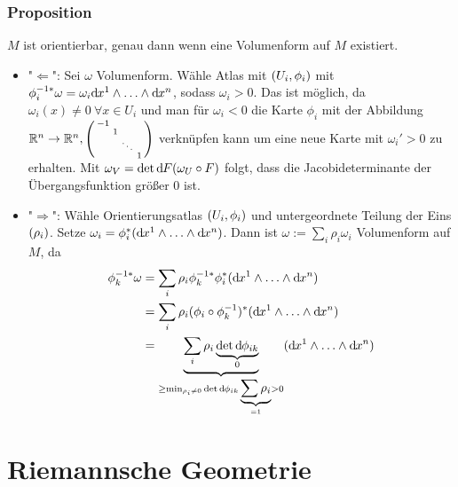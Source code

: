 \subsubsection{Proposition}
\label{ssub:1103}
$M$ ist orientierbar, genau dann wenn eine Volumenform auf $M$ existiert.
\begin{itemize}
\item "$\Leftarrow$": Sei $\omega$ Volumenform. Wähle Atlas mit $\enbrace{U_i,\phi_i}$ mit $\phi_i^{-1*} \omega = \omega_i \mathd x^1 \wedge \ldots \wedge \mathd x^n$, sodass $\omega_i > 0$. Das ist möglich, da $\omega_i(x) \neq 0\ \forall x\in U_i$ und man für $\omega_i < 0$ die Karte $\phi_i$ mit der Abbildung $\mathds{R}^n \to \mathds{R}^n, 
\begin{psmallmatrix}
-1&&&\\
&1&&\\
&&\ddots&\\
&&&1
\end{psmallmatrix}$ verknüpfen kann um eine neue Karte mit $\omega_i' > 0$ zu erhalten. Mit $\omega_V = \det \mathd F(\omega_U \circ F)$ folgt, dass die Jacobideterminante der Übergangsfunktion größer $0$ ist.
\item "$\Rightarrow$": Wähle Orientierungsatlas $\enbrace{U_i,\phi_i}$ und untergeordnete Teilung der Eins $\enbrace{\rho_i}$. Setze $\omega_i = \phi_i^*\enbrace{\mathd x^1 \wedge \ldots \wedge \mathd x^n}$. Dann ist $\omega := \sum_i \rho_i \omega_i$ Volumenform auf $M$, da
\begin{align*}
\phi_k^{-1*} \omega &= \sum_i \rho_i \phi_k^{-1*} \phi_i^* \enbrace{\mathd x^1 \wedge \ldots \wedge \mathd x^n}\\
&= \sum_i \rho_i \enbrace{\phi_i\circ \phi_k^{-1}}^* \enbrace{\mathd x^1 \wedge \ldots \wedge \mathd x^n}\\
&= \underbrace{\sum_i \rho_i \underbrace{\det \mathd \phi_{ik}}_{0}}_{\geq \min_{\rho_i \neq 0} \det \mathd \phi_{ik} \underbrace{\sum \rho_i}_{=1} > 0} \enbrace{\mathd x^1 \wedge \ldots \wedge \mathd x^n}\\
\end{align*}
\end{itemize}



\section{Riemannsche Geometrie}
\label{sec:2}

